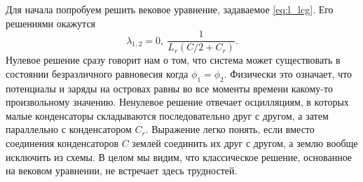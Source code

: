 \documentclass[14pt, a4paper]{extreport}
\numberwithin{equation}{section}
\begin{document}
Для начала попробуем решить вековое уравнение, задаваемое \eqref{eq:l_lcg}. Его решениями окажутся
\begin{equation}
	\lambda_{1,2} = 0,\ \frac {1}{L_r \left( C/2 + C_r \right) }.	
\end{equation}
Нулевое решение сразу говорит нам о том, что система может существовать в состоянии безразличного равновесия когда $\phi_1 = \phi_2$. Физически это означает, что потенциалы и заряды на островах равны во все моменты времени какому-то произвольному значению. Ненулевое решение отвечает осцилляциям, в которых малые конденсаторы складываются последовательно друг с другом, а затем параллельно с конденсатором $C_r$. Выражение легко понять, если вместо соединения конденсаторов $C$ землей соединить их друг с другом, а землю вообще исключить из схемы. В целом мы видим, что классическое решение, основанное на вековом уравнении, не встречает здесь трудностей.
\end{document}
